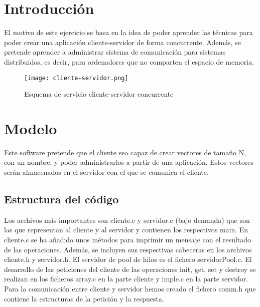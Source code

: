\documentclass[10pt, spanish, pdftex]{template/UC3M_document}
\author{Alejandro Prieto Macías}         %
\begin{document}
\titleMain

\begin{spacing}{0.5}
    \hypersetup{linkcolor=black}    %
    \tableofcontents\newpage        %
\end{spacing}


\section{Introducción}\label{section_label}
El motivo de este ejercicio se basa en la idea de poder aprender las técnicas para poder crear una aplicación cliente-servidor de forma concurrente. Además, se pretende aprender a administrar sistema de comunicación para sistemas distribuidos, es decir, para ordenadores que no comparten el espacio de memoria.

  \vspace{2cm}
  \begin{figure}[h]
    \centering
    \texttt{[image: cliente-servidor.png]}
    \caption{Esquema de servicio cliente-servidor concurrente}
  \end{figure}


\newpage
\section{Modelo}
Este software pretende que el cliente sea capaz de crear vectores de tamaño N, con un nombre, y poder administrarlos a partir de una aplicación. Estos vectores serán almacenados en el servidor con el que se comunica el cliente.

\subsection{Estructura del código}
Los archivos más importantes son cliente.c y servidor.c (bajo demanda) que son las que representan al cliente y al servidor y contienen los respectivos main. En cliente.c se ha añadido unos métodos para imprimir un mensaje con el resultado de las operaciones. Además, se incluyen sus respectivas cabeceras en los archivos cliente.h y servidor.h. El servidor de pool de hilos es el fichero servidorPool.c. El desarrollo de las peticiones del cliente de las operaciones init, get, set y destroy se realizan en los ficheros array.c en la parte cliente y imple.c en la parte servidor.
Para la comunicación entre cliente y servidor hemos creado el fichero comm.h que contiene la estructuras de la petición y la respuesta.
\end{document}

